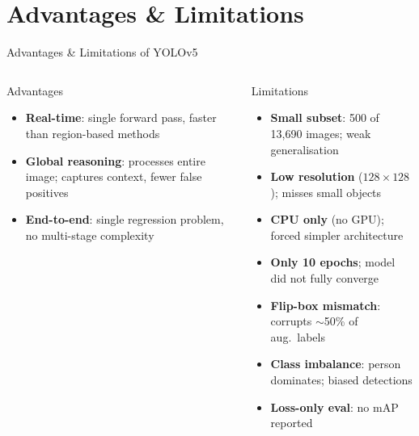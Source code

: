 \documentclass[aspectratio=169,10pt]{beamer}
\begin{document}
\section{Advantages \& Limitations}
\begin{frame}{Advantages \& Limitations of YOLOv5}
  \begin{columns}[T]
      \begin{exampleblock}{Advantages}
        \footnotesize
        \begin{itemize}\setlength\itemsep{2pt}
          \item \textbf{Real-time}: single forward pass, faster than region-based methods
          \item \textbf{Global reasoning}: processes entire image; captures context, fewer false positives
          \item \textbf{End-to-end}: single regression problem, no multi-stage complexity
        \end{itemize}
      \end{exampleblock}
      \begin{alertblock}{Limitations}
       
\begin{itemize}
  \item \textbf{Small subset}: 500 of 13,690 images; weak generalisation
      \item \textbf{Low resolution} ($128\times128$); misses small objects
      \item \textbf{CPU only} (no GPU); forced simpler architecture
      \item \textbf{Only 10 epochs}; model did not fully converge
      \item \textbf{Flip-box mismatch}: corrupts $\sim$50\% of aug.\ labels
      \item \textbf{Class imbalance}: person dominates; biased detections
      \item \textbf{Loss-only eval}: no mAP reported
\end{itemize}
      \end{alertblock}
  \end{columns}
\end{frame}

\end{document}
